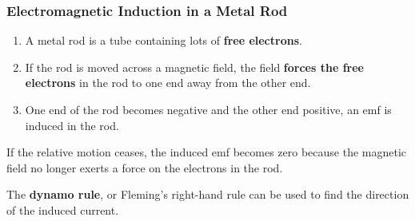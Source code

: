 \subsubsection*{Electromagnetic Induction in a Metal Rod}
\begin{enumerate}
    \item A metal rod is a tube containing lots of \textbf{free electrons}.
    \item If the rod is moved across a magnetic field, the field \textbf{forces the free electrons} in the rod to one end away from the other end.
    \item One end of the rod becomes negative and the other end positive, an emf is induced in the rod.
\end{enumerate}

If the relative motion ceases, the induced emf becomes zero because the magnetic field no longer exerts a force on the electrons in the rod.

The \textbf{dynamo rule}, or Fleming's right-hand rule can be used to find the direction of the induced current.
